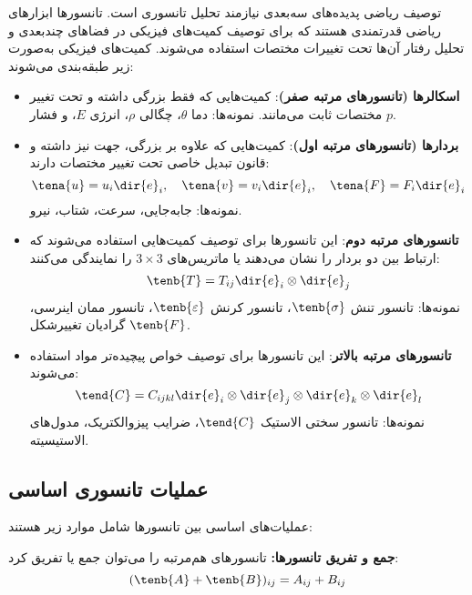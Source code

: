 توصیف ریاضی پدیده‌های سه‌بعدی نیازمند تحلیل تانسوری است. تانسورها ابزارهای ریاضی قدرتمندی هستند که برای توصیف کمیت‌های فیزیکی در فضاهای چندبعدی و تحلیل رفتار آن‌ها تحت تغییرات مختصات استفاده می‌شوند. کمیت‌های فیزیکی به‌صورت زیر طبقه‌بندی می‌شوند:

\begin{itemize}
	\item \textbf{اسکالرها (تانسورهای مرتبه صفر)}: کمیت‌هایی که فقط بزرگی داشته و تحت تغییر مختصات ثابت می‌مانند. نمونه‌ها: دما $\theta$، چگالی $\rho$، انرژی $E$، و فشار $p$.

	\item \textbf{بردارها (تانسورهای مرتبه اول)}: کمیت‌هایی که علاوه بر بزرگی، جهت نیز داشته و قانون تبدیل خاصی تحت تغییر مختصات دارند:
	      \begin{equation}
		      \tena{u} = u_i \dir{e}_i, \quad \tena{v} = v_i \dir{e}_i, \quad \tena{F} = F_i \dir{e}_i
	      \end{equation}
	      نمونه‌ها: جابه‌جایی، سرعت، شتاب، نیرو.

	\item \textbf{تانسورهای مرتبه دوم}: این تانسورها برای توصیف کمیت‌هایی استفاده می‌شوند که ارتباط بین دو بردار را نشان می‌دهند یا ماتریس‌های $3 \times 3$ را نمایندگی می‌کنند:
	      \begin{equation}
		      \tenb{T} = T_{ij} \dir{e}_i \otimes \dir{e}_j
	      \end{equation}
	      نمونه‌ها: تانسور تنش $\tenb{\sigma}$، تانسور کرنش $\tenb{\varepsilon}$، تانسور ممان اینرسی، گرادیان تغییرشکل $\tenb{F}$.

	\item \textbf{تانسورهای مرتبه بالاتر}: این تانسورها برای توصیف خواص پیچیده‌تر مواد استفاده می‌شوند:
	      \begin{equation}
		      \tend{C} = C_{ijkl} \dir{e}_i \otimes \dir{e}_j \otimes \dir{e}_k \otimes \dir{e}_l
	      \end{equation}
	      نمونه‌ها: تانسور سختی الاستیک $\tend{C}$، ضرایب پیزوالکتریک، مدول‌های الاستیسیته.
\end{itemize}

\subsection{عملیات تانسوری اساسی}

عملیات‌های اساسی بین تانسورها شامل موارد زیر هستند:

\textbf{جمع و تفریق تانسورها:} تانسورهای هم‌مرتبه را می‌توان جمع یا تفریق کرد:
\begin{equation}
	(\tenb{A} + \tenb{B})_{ij} = A_{ij} + B_{ij}
\end{equation}


